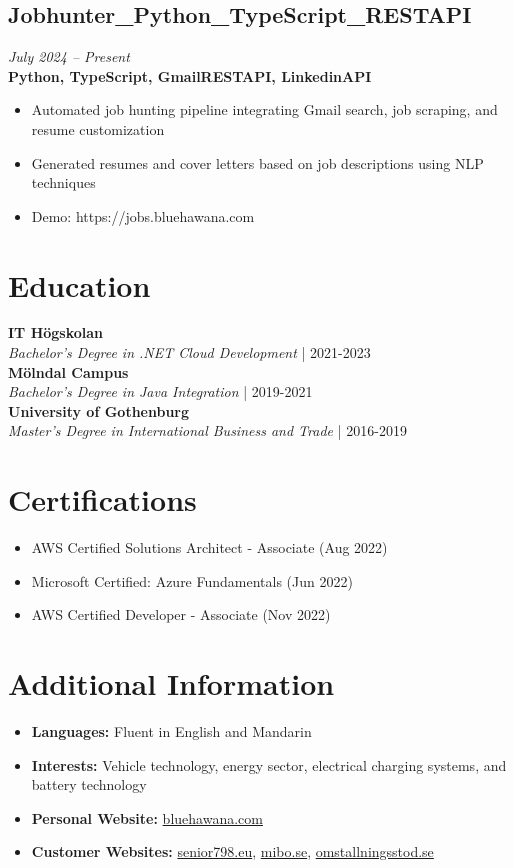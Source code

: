\documentclass[11pt,a4paper]{article}
\begin{document}
\subsection{Jobhunter\_Python\_TypeScript\_RESTAPI}
\textit{July 2024 -- Present} \\
\textbf{Python, TypeScript, GmailRESTAPI, LinkedinAPI}
\begin{itemize}
\item Automated job hunting pipeline integrating Gmail search, job scraping, and resume customization
\item Generated resumes and cover letters based on job descriptions using NLP techniques
\item Demo: https://jobs.bluehawana.com
\end{itemize}


\section*{Education}
\textbf{IT Högskolan}\\
\textit{Bachelor's Degree in .NET Cloud Development} | 2021-2023\\
\textbf{Mölndal Campus}\\
\textit{Bachelor's Degree in Java Integration} | 2019-2021\\
\textbf{University of Gothenburg}\\
\textit{Master's Degree in International Business and Trade} | 2016-2019\\

\section*{Certifications}
\begin{itemize}
\item AWS Certified Solutions Architect - Associate (Aug 2022)
\item Microsoft Certified: Azure Fundamentals (Jun 2022)
\item AWS Certified Developer - Associate (Nov 2022)
\end{itemize}

\section*{Additional Information}
\begin{itemize}
\item \textbf{Languages:} Fluent in English and Mandarin
\item \textbf{Interests:} Vehicle technology, energy sector, electrical charging systems, and battery technology
\item \textbf{Personal Website:} \href{https://www.bluehawana.com}{bluehawana.com}
\item \textbf{Customer Websites:} \href{https://www.senior798.eu}{senior798.eu}, \href{https://www.mibo.se}{mibo.se}, \href{https://www.omstallningsstod.se}{omstallningsstod.se}
\end{itemize}
\end{document}
